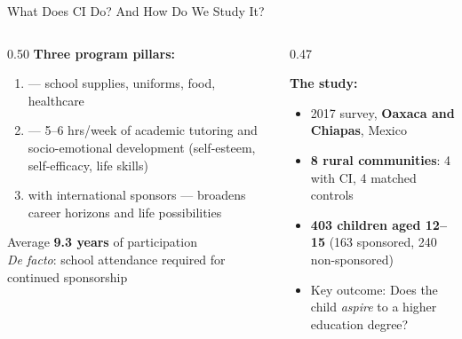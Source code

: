 \documentclass[aspectratio=169, 10pt]{beamer}
\begin{document}
\begin{frame}{What Does CI Do? And How Do We Study It?}
  \begin{columns}
    \begin{column}{0.50\textwidth}
      \textbf{Three program pillars:}
      \begin{enumerate}
        \item {} — school supplies, uniforms, food, healthcare
        \item {} — 5--6 hrs/week of academic tutoring and socio-emotional development (self-esteem, self-efficacy, life skills)
        \item {} with international sponsors — broadens career horizons and life possibilities
      \end{enumerate}
      \vspace{0.4em}
      Average \textbf{9.3 years} of participation\\
      \textit{De facto}: school attendance required for continued sponsorship
    \end{column}
    \begin{column}{0.47\textwidth}
      \begin{methodbox}
        \textbf{The study:}\\[0.2em]
        \begin{itemize}
          \item 2017 survey, \textbf{Oaxaca and Chiapas}, Mexico
          \item \textbf{8 rural communities}: 4 with CI, 4 matched controls
          \item \textbf{403 children aged 12--15} (163 sponsored, 240 non-sponsored)
          \item Key outcome: Does the child \textit{aspire} to a higher education degree?
        \end{itemize}
      \end{methodbox}
    \end{column}
  \end{columns}
\end{frame}
\end{document}
